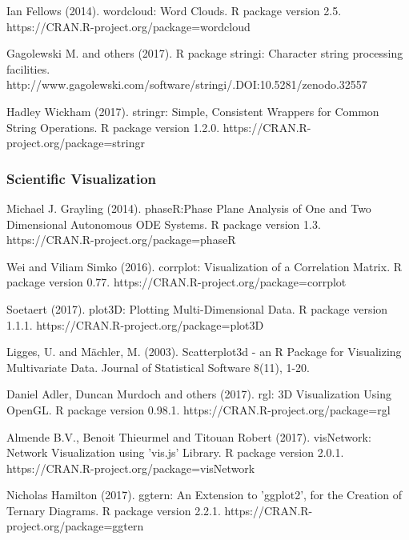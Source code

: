 \documentclass[preprint, 8pt]{elsarticle}
\theoremstyle{definition}
\begin{document}
\begin{table}[H]
\begin{thebibliography}{00}
 Ian Fellows (2014). 
\newblock wordcloud: Word Clouds. R package version 2.5.
\newblock https://CRAN.R-project.org/package=wordcloud

 Gagolewski M. and others (2017). 
\newblock R package stringi: Character string processing facilities. 
\newblock http://www.gagolewski.com/software/stringi/.DOI:10.5281/zenodo.32557

 Hadley Wickham (2017).
\newblock stringr: Simple, Consistent Wrappers for Common String Operations. 
\newblock R package version 1.2.0. https://CRAN.R-project.org/package=stringr

\subsubsection{Scientific Visualization}

Michael J. Grayling (2014). 
\newblock phaseR:Phase Plane Analysis of One and Two Dimensional Autonomous ODE Systems. 
\newblock R package version 1.3. https://CRAN.R-project.org/package=phaseR

 Wei and Viliam Simko (2016).
\newblock corrplot: Visualization of a Correlation Matrix. 
\newblock R package version 0.77. https://CRAN.R-project.org/package=corrplot

 Soetaert (2017). 
\newblock plot3D: Plotting Multi-Dimensional Data. 
\newblock R package version 1.1.1. https://CRAN.R-project.org/package=plot3D

 Ligges, U. and Mächler, M. (2003).
\newblock Scatterplot3d - an R Package for Visualizing Multivariate Data.
\newblock Journal of Statistical Software 8(11), 1-20.

Daniel Adler, Duncan Murdoch and others (2017). 
\newblock rgl: 3D Visualization Using OpenGL. 
\newblock R package version 0.98.1. https://CRAN.R-project.org/package=rgl

 Almende B.V., Benoit Thieurmel and Titouan Robert (2017). visNetwork:
\newblock Network Visualization using 'vis.js' Library. R package version 2.0.1.
\newblock https://CRAN.R-project.org/package=visNetwork

 Nicholas Hamilton (2017). 
\newblock ggtern: An Extension to 'ggplot2', for the Creation of Ternary Diagrams. 
\newblock R package version 2.2.1. https://CRAN.R-project.org/package=ggtern


\end{thebibliography}
\end{table}
\end{document}
